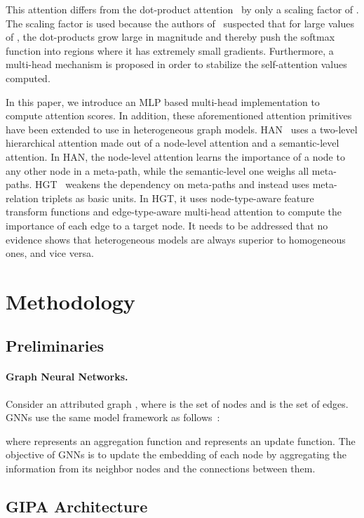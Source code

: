 \documentclass[sigconf]{acmart}
\begin{document}
This attention differs from the dot-product attention~\cite{luong2015effective} by only a scaling factor of .
The scaling factor is used because the authors of~\cite{vaswani2017attention} suspected that for large values of , the dot-products grow large in magnitude and thereby push the softmax function into regions where it has extremely small gradients.
Furthermore, a multi-head mechanism is proposed in order to stabilize the self-attention values computed.

In this paper, we introduce an MLP based multi-head implementation to compute attention scores.
In addition, these aforementioned attention primitives have been extended to use in heterogeneous graph models.
HAN~\cite{wang2019heterogeneous} uses a two-level hierarchical attention made out of a node-level attention and a semantic-level attention.
In HAN, the node-level attention learns the importance of a node to any other node in a meta-path, while the semantic-level one weighs all meta-paths.
HGT~\cite{zhang2019heterogeneous} weakens the dependency on meta-paths and instead uses meta-relation triplets as basic units.
In HGT, it uses node-type-aware feature transform functions and edge-type-aware multi-head attention to compute the importance of each edge to a target node.
It needs to be addressed that no evidence shows that heterogeneous models are always superior to homogeneous ones, and vice versa. 
\section{Methodology}
\label{sec:method}
\subsection{Preliminaries}

\paragraph{Graph Neural Networks.} Consider an attributed graph , where  is the set of nodes and  is the set of edges. GNNs use the same model framework as follows~\cite{hamilton2017inductive,xu2018powerful}:


\noindent where  represents an aggregation function and  represents an update function. The objective of GNNs is to update the embedding of each node by aggregating the information from its neighbor nodes and the connections between them. 

\subsection{GIPA Architecture}
\end{document}
